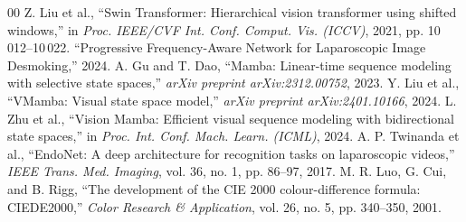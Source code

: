 \documentclass[conference]{IEEEtran}
\begin{document}
\begin{thebibliography}{00}
 Z. Liu et al., ``Swin Transformer: Hierarchical vision transformer using shifted windows,'' in \textit{Proc. IEEE/CVF Int. Conf. Comput. Vis. (ICCV)}, 2021, pp. 10\,012--10\,022.
 ``Progressive Frequency-Aware Network for Laparoscopic Image Desmoking,'' 2024.
 A. Gu and T. Dao, ``Mamba: Linear-time sequence modeling with selective state spaces,'' \textit{arXiv preprint arXiv:2312.00752}, 2023.
 Y. Liu et al., ``VMamba: Visual state space model,'' \textit{arXiv preprint arXiv:2401.10166}, 2024.
 L. Zhu et al., ``Vision Mamba: Efficient visual sequence modeling with bidirectional state spaces,'' in \textit{Proc. Int. Conf. Mach. Learn. (ICML)}, 2024.
 A. P. Twinanda et al., ``EndoNet: A deep architecture for recognition tasks on laparoscopic videos,'' \textit{IEEE Trans. Med. Imaging}, vol. 36, no. 1, pp. 86--97, 2017.
 M. R. Luo, G. Cui, and B. Rigg, ``The development of the CIE 2000 colour-difference formula: CIEDE2000,'' \textit{Color Research \& Application}, vol. 26, no. 5, pp. 340--350, 2001.
\end{thebibliography}
\end{document}
